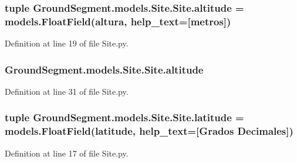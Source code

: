 \subsubsection[{altitude}]{\setlength{\rightskip}{0pt plus 5cm}tuple Ground\+Segment.\+models.\+Site.\+Site.\+altitude = models.\+Float\+Field(\textquotesingle{}altura\textquotesingle{}, help\+\_\+text=\textquotesingle{}\mbox{[}metros\mbox{]}\textquotesingle{})\hspace{0.3cm}{\ttfamily [static]}}\label{class_ground_segment_1_1models_1_1_site_1_1_site_a10d68a4cae29dd12f3cb610fee85a0cc}


Definition at line 19 of file Site.\+py.

\hypertarget{class_ground_segment_1_1models_1_1_site_1_1_site_a6413a7ac28bc334b33f4b7ff9ec709c8}{}
\subsubsection[{altitude}]{\setlength{\rightskip}{0pt plus 5cm}Ground\+Segment.\+models.\+Site.\+Site.\+altitude}\label{class_ground_segment_1_1models_1_1_site_1_1_site_a6413a7ac28bc334b33f4b7ff9ec709c8}


Definition at line 31 of file Site.\+py.

\hypertarget{class_ground_segment_1_1models_1_1_site_1_1_site_ae70f374ee6697a66ad45e7fb6b753bd7}{}
\subsubsection[{latitude}]{\setlength{\rightskip}{0pt plus 5cm}tuple Ground\+Segment.\+models.\+Site.\+Site.\+latitude = models.\+Float\+Field(\textquotesingle{}latitude\textquotesingle{}, help\+\_\+text=\textquotesingle{}\mbox{[}Grados Decimales\mbox{]}\textquotesingle{})\hspace{0.3cm}{\ttfamily [static]}}\label{class_ground_segment_1_1models_1_1_site_1_1_site_ae70f374ee6697a66ad45e7fb6b753bd7}


Definition at line 17 of file Site.\+py.

